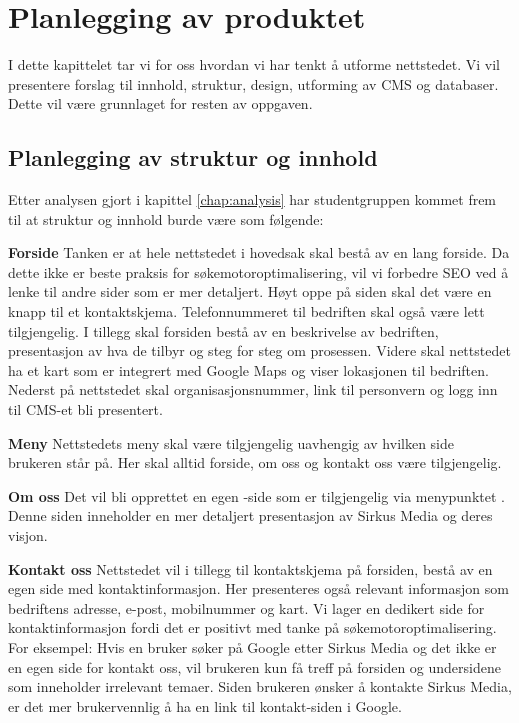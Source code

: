 \cleardoublepage
\chapter{Planlegging av produktet}
\label{chap:design} 

I dette kapittelet tar vi for oss hvordan vi har tenkt å utforme nettstedet. Vi vil presentere forslag til innhold, struktur, design, utforming av CMS og databaser. Dette vil være grunnlaget for resten av oppgaven.

\section{Planlegging av struktur og innhold}
\label{sec:planning-website}

Etter analysen gjort i kapittel \ref{chap:analysis} har studentgruppen kommet frem til at struktur og innhold burde være som følgende: 

\textbf{Forside} Tanken er at hele nettstedet i hovedsak skal bestå av en lang forside. Da dette ikke er beste praksis for søkemotoroptimalisering, vil vi forbedre SEO ved å lenke til andre sider som er mer detaljert. Høyt oppe på siden skal det være en knapp til et kontaktskjema. Telefonnummeret til bedriften skal også være lett tilgjengelig. I tillegg skal forsiden bestå av en beskrivelse av bedriften, presentasjon av hva de tilbyr og steg for steg om prosessen. Videre skal nettstedet ha et kart som er integrert med Google Maps og viser lokasjonen til bedriften. Nederst på nettstedet skal organisasjonsnummer, link til personvern og logg inn til CMS-et bli presentert.

\textbf{Meny} Nettstedets meny skal være tilgjengelig uavhengig av hvilken side brukeren står på. Her skal alltid forside, om oss og kontakt oss være tilgjengelig. 

\textbf{Om oss} Det vil bli opprettet en egen -side som er tilgjengelig via menypunktet . Denne siden inneholder en mer detaljert presentasjon av Sirkus Media og deres visjon.

\textbf{Kontakt oss} Nettstedet vil i tillegg til kontaktskjema på forsiden, bestå av en egen side med kontaktinformasjon. Her presenteres også relevant informasjon som bedriftens adresse, e-post, mobilnummer og kart. Vi lager en dedikert side for kontaktinformasjon fordi det er positivt med tanke på søkemotoroptimalisering. For eksempel: Hvis en bruker søker på Google etter Sirkus Media og det ikke er en egen side for kontakt oss, vil brukeren kun få treff på forsiden og undersidene som inneholder irrelevant temaer. Siden brukeren ønsker å kontakte Sirkus Media, er det mer brukervennlig å ha en link til kontakt-siden i Google.

